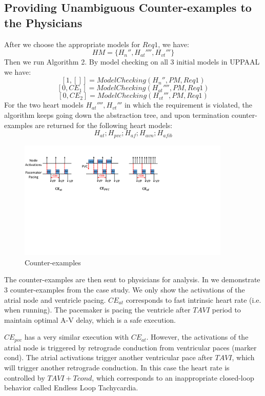 \subsection{Providing Unambiguous Counter-examples to the Physicians}
After we choose the appropriate models for $Req1$, we have: 
$$HM=\{H_n'',H_{at}'''',H_{vt}'''\}$$
Then we run Algorithm 2. By model checking on all 3 initial models in UPPAAL we have: 
$$[1,[]]=ModelChecking(H_n'',PM,Req1)$$
 $$[0,CE_1]=ModelChecking(H_{at}'''',PM,Req1)$$
$$[0,CE_2]=ModelChecking(H_{vt}''',PM,Req1)$$
For the two heart models $H_{at}'''',H_{vt}'''$ in which the requirement is violated, the algorithm keeps going down the abstraction tree, and upon termination counter-examples are returned for the following heart models:
$$H_{at};H_{pvc};H_{af};H_{avn};H_{afib}$$

\begin{figure}[!t]
		\centering
		\includegraphics[width=0.9\textwidth]{figs/case.pdf}
		\caption{\small Counter-examples}
		\label{fig:CE}
\end{figure}

The counter-examples are then sent to physicians for analysis. In  we demonstrate 3 counter-examples from the case study. We only show the activations of the atrial node and ventricle pacing. 
$CE_{at}$ corresponds to fast intrinsic heart rate (i.e. when running). The pacemaker is pacing the ventricle after $TAVI$ period to maintain optimal A-V delay, which is a safe execution. 

$CE_{pvc}$ has a very similar execution with $CE_{at}$. However, the activations of the atrial node is triggered by retrograde conduction from ventricular paces (marker \textsf{cond}). The atrial activations trigger another ventricular pace after $TAVI$, which will trigger another retrograde conduction. In this case the heart rate is controlled by $TAVI+Tcond$, which corresponds to an inappropriate closed-loop behavior called Endless Loop Tachycardia.

